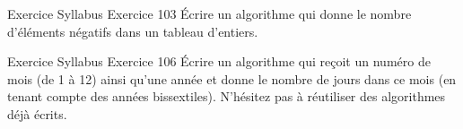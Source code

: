 \begin{frame}{Exercice \theexercice}{Syllabus Exercice 103}
    Écrire un algorithme qui
    donne le nombre d’éléments négatifs dans un tableau d’entiers.
\end{frame}

\begin{frame}{Exercice \theexercice}{Syllabus Exercice 106}
    Écrire un algorithme qui reçoit un numéro de mois (de 1 à 12)
    ainsi qu’une année et donne le nombre de jours dans ce mois
    (en tenant compte des années bissextiles).
    N’hésitez pas à réutiliser des algorithmes déjà écrits.
\end{frame}
